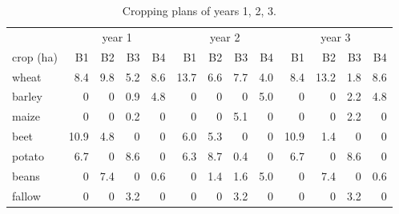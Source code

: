 \begin{table}[!ht]
\centering\footnotesize
\begin{tabular}{lrrrr|rrrr|rrrr}
\toprule
 & \multicolumn{4}{c|}{year 1} & \multicolumn{4}{c|}{year 2} & \multicolumn{4}{c}{year 3}\\
crop (ha) & B1 & B2 & B3 & B4 & B1 & B2 & B3 & B4 & B1 & B2 & B3 & B4\\
\midrule
wheat  & 8.4 & 9.8 & 5.2 & 8.6 & 13.7 & 6.6 & 7.7 & 4.0 & 8.4 & 13.2 & 1.8 & 8.6\\
barley & 0 & 0 & 0.9 & 4.8 & 0 & 0 & 0 & 5.0 & 0 & 0 & 2.2 & 4.8\\
maize  & 0 & 0 & 0.2 & 0 & 0 & 0 & 5.1 & 0 & 0 & 0 & 2.2 & 0\\
beet   & 10.9 & 4.8 & 0 & 0 & 6.0 & 5.3 & 0 & 0 & 10.9 & 1.4 & 0 & 0\\
potato & 6.7 & 0 & 8.6 & 0 & 6.3 & 8.7 & 0.4 & 0 & 6.7 & 0 & 8.6 & 0\\
beans  & 0 & 7.4 & 0 & 0.6 & 0 & 1.4 & 1.6 & 5.0 & 0 & 7.4 & 0 & 0.6\\
fallow & 0 & 0 & 3.2 & 0 & 0 & 0 & 3.2 & 0 & 0 & 0 & 3.2 & 0\\
\bottomrule
\end{tabular}
\caption{Cropping plans of years 1, 2, 3.}
\end{table}
